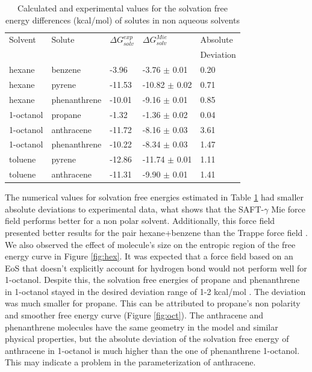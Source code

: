 \begin{table}[h]
\centering
  \caption{Calculated and experimental values for the solvation free energy differences (kcal/mol) of solutes in non aqueous solvents}
  \label{tbl:solv1}
  \begin{tabular}{lllll}
    \hline
      Solvent & Solute & $\Delta G_{solv}^{exp}$ & $\Delta G_{solv}^{Mie}$ & Absolute \\
      & & & & Deviation \\
    \hline
    hexane    & benzene      & -3.96  & -3.76  $\pm$ 0.01 & 0.20 \\
    hexane    & pyrene       & -11.53 & -10.82 $\pm$ 0.02 & 0.71 \\
    hexane    & phenanthrene & -10.01 & -9.16  $\pm$ 0.01 & 0.85 \\
    1-octanol & propane      & -1.32  & -1.36  $\pm$ 0.02 & 0.04 \\
    1-octanol & anthracene   & -11.72 & -8.16  $\pm$ 0.03 & 3.61 \\
    1-octanol & phenanthrene & -10.22 & -8.34  $\pm$ 0.03 & 1.47 \\
    toluene   & pyrene       & -12.86 & -11.74 $\pm$ 0.01 & 1.11\\
    toluene   & anthracene   & -11.31 & -9.90 $\pm$ 0.01 & 1.41\\
    \hline
  \end{tabular}
\end{table}

The numerical values for solvation free energies estimated in Table \ref{tbl:solv1} had smaller absolute deviations to experimental data, what shows that the SAFT-$\gamma$ Mie force field performs better for a non polar solvent. Additionally, this force field presented better results for the pair hexane+benzene than the Trappe force field \cite{garrido2011}. We also observed the effect of molecule's size on the entropic region of the free energy curve in Figure \ref{fig:hex}. It was expected that a force field based on an EoS that doesn't explicitly account for hydrogen bond would not perform well for 1-octanol. Despite this, the solvation free energies of propane and phenanthrene in 1-octanol stayed in the desired deviation range of 1-2 kcal/mol \cite{doimobley}. The deviation was much smaller for propane. This can be attributed to propane's non polarity and smoother free energy curve (Figure \ref{fig:oct}). The anthracene and phenanthrene molecules have the same geometry in the model and similar physical properties, but the absolute deviation of the solvation free energy of anthracene in 1-octanol is much higher than the one of phenanthrene 1-octanol. This may indicate a problem in the parameterization of anthracene.     

